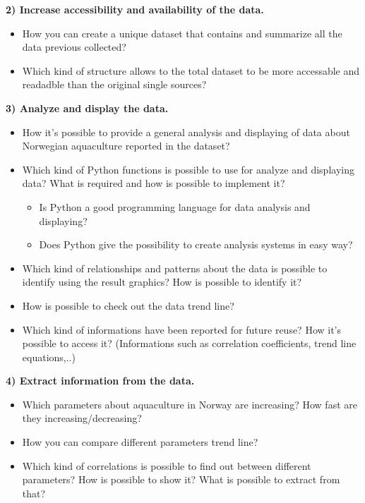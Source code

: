 
\textbf{2) Increase accessibility and availability of the data.}
\vspace{-5mm}
\begin{itemize}
 \setlength{\itemsep}{-5pt}
  \item How you can create a unique dataset that contains and summarize all the data previous collected?
  \item Which kind of structure allows to the total dataset to be more accessable and readadble than the original single sources?
\end{itemize}
 
\textbf{3) Analyze and display the data.}
\vspace{-5mm}
\begin{itemize}
 \setlength{\itemsep}{-5pt}
  \item How it's possible to provide a general analysis and displaying of data about Norwegian aquaculture reported in the dataset?
  \item Which kind of Python functions is possible to use for analyze and displaying data? What is required and how is possible to implement it?
	\vspace{-3mm}
	\begin{itemize}
 	\setlength{\itemsep}{-5pt}
	\item Is Python a good programming language for data analysis and displaying?
	\item Does Python give the possibility to create analysis systems in easy way?
	 \end{itemize}
  \item Which kind of relationships and patterns about the data is possible to identify using the result graphics? How is possible to identify it?
  \item How is possible to check out the data trend line? 
  \item Which kind of informations have been reported for future reuse? How it's possible to access it? (Informations such as correlation coefficients, trend line equations,..)
 \end{itemize}


\textbf{4) Extract information from the data.}
\vspace{-5mm}
\begin{itemize}
 \setlength{\itemsep}{-5pt}
  \item Which parameters about aquaculture in Norway are increasing? How fast are they increasing/decreasing? 
  \item How you can compare different parameters trend line?
  \item Which kind of correlations is possible to find out between different parameters? How is possible to show it? What is possible to extract from that?
 \end{itemize}
 
